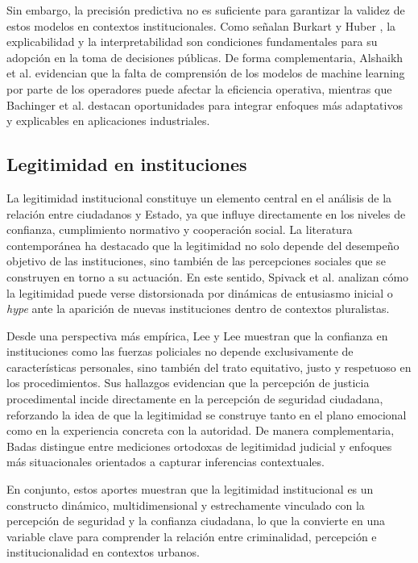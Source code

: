 \documentclass[sn-basic,pdflatex]{sn-jnl}
\theoremstyle{remark}
\theoremstyle{definition}
\begin{document}
Sin embargo, la precisión predictiva no es suficiente para garantizar la
validez de estos modelos en contextos institucionales. Como señalan
Burkart y Huber \citep{burkart2021}, la explicabilidad y la
interpretabilidad son condiciones fundamentales para su adopción en la
toma de decisiones públicas. De forma complementaria, Alshaikh et al.
\citep{alshaikh2023} evidencian que la falta de comprensión de los
modelos de machine learning por parte de los operadores puede afectar la
eficiencia operativa, mientras que Bachinger et al.
\citep{bachinger2024} destacan oportunidades para integrar enfoques más
adaptativos y explicables en aplicaciones industriales.

\subsection{Legitimidad en
instituciones}\label{legitimidad-en-instituciones}

La legitimidad institucional constituye un elemento central en el
análisis de la relación entre ciudadanos y Estado, ya que influye
directamente en los niveles de confianza, cumplimiento normativo y
cooperación social. La literatura contemporánea ha destacado que la
legitimidad no solo depende del desempeño objetivo de las instituciones,
sino también de las percepciones sociales que se construyen en torno a
su actuación. En este sentido, Spivack et al. \citep{spivack2025}
analizan cómo la legitimidad puede verse distorsionada por dinámicas de
entusiasmo inicial o \emph{hype} ante la aparición de nuevas
instituciones dentro de contextos pluralistas.

Desde una perspectiva más empírica, Lee y Lee \citep{lee2021} muestran
que la confianza en instituciones como las fuerzas policiales no depende
exclusivamente de características personales, sino también del trato
equitativo, justo y respetuoso en los procedimientos. Sus hallazgos
evidencian que la percepción de justicia procedimental incide
directamente en la percepción de seguridad ciudadana, reforzando la idea
de que la legitimidad se construye tanto en el plano emocional como en
la experiencia concreta con la autoridad. De manera complementaria,
Badas \citep{badas2019} distingue entre mediciones ortodoxas de
legitimidad judicial y enfoques más situacionales orientados a capturar
inferencias contextuales.

En conjunto, estos aportes muestran que la legitimidad institucional es
un constructo dinámico, multidimensional y estrechamente vinculado con
la percepción de seguridad y la confianza ciudadana, lo que la convierte
en una variable clave para comprender la relación entre criminalidad,
percepción e institucionalidad en contextos urbanos.
\end{document}
